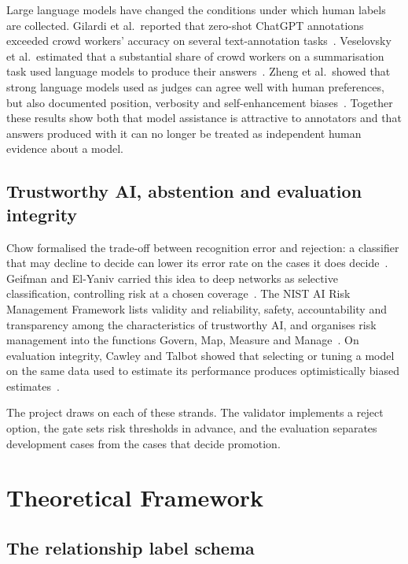 Large language models have changed the conditions under which human labels are collected. Gilardi et al.\ reported that zero-shot ChatGPT annotations exceeded crowd workers' accuracy on several text-annotation tasks~\cite{gilardi2023}. Veselovsky et al.\ estimated that a substantial share of crowd workers on a summarisation task used language models to produce their answers~\cite{veselovsky2023}. Zheng et al.\ showed that strong language models used as judges can agree well with human preferences, but also documented position, verbosity and self-enhancement biases~\cite{zheng2023}. Together these results show both that model assistance is attractive to annotators and that answers produced with it can no longer be treated as independent human evidence about a model.

\subsection{Trustworthy AI, abstention and evaluation integrity}

Chow formalised the trade-off between recognition error and rejection: a classifier that may decline to decide can lower its error rate on the cases it does decide~\cite{chow1970}. Geifman and El-Yaniv carried this idea to deep networks as selective classification, controlling risk at a chosen coverage~\cite{geifman2017}. The NIST AI Risk Management Framework lists validity and reliability, safety, accountability and transparency among the characteristics of trustworthy AI, and organises risk management into the functions Govern, Map, Measure and Manage~\cite{tabassi2023}. On evaluation integrity, Cawley and Talbot showed that selecting or tuning a model on the same data used to estimate its performance produces optimistically biased estimates~\cite{cawley2010}.

The project draws on each of these strands. The validator implements a reject option, the gate sets risk thresholds in advance, and the evaluation separates development cases from the cases that decide promotion.

\section{Theoretical Framework}
\label{sec:framework}

\subsection{The relationship label schema}

